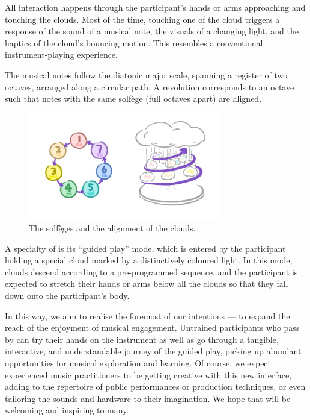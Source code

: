 \documentclass{nimemusic}
\begin{document}
All interaction happens through the participant's hands or arms approaching and touching the clouds. Most of the time, touching one of the cloud triggers a response of the sound of a musical note, the visuals of a changing light, and the haptics of the cloud's bouncing motion. This resembles a conventional instrument-playing experience.

The musical notes follow the diatonic major scale, spanning a register of two octaves, arranged along a circular path. A revolution corresponds to an octave such that notes with the same solf\`{e}ge (full octaves apart) are aligned.

\begin{figure}[h!]
  \includegraphics[width=0.75\textwidth]{../../images/CuHum_Solfege.jpg}
  \caption{The solf\`{e}ges and the alignment of the clouds.}
  \label{fig:Solfege}
\end{figure}

A specialty of \CuHum{} is its ``guided play'' mode, which is entered by the participant holding a special cloud marked by a distinctively coloured light. In this mode, clouds descend according to a pre-programmed sequence, and the participant is expected to stretch their hands or arms below all the clouds so that they fall down onto the participant's body.

In this way, we aim to realise the foremost of our intentions --- to expand the reach of the enjoyment of musical engagement. Untrained participants who pass by can try their hands on the instrument as well as go through a tangible, interactive, and understandable journey of the guided play, picking up abundant opportunities for musical exploration and learning. Of course, we expect experienced music practitioners to be getting creative with this new interface, adding to the repertoire of public performances or production techniques, or even tailoring the sounds and hardware to their imagination. We hope that \CuHum{} will be welcoming and inspiring to many.
\end{document}
